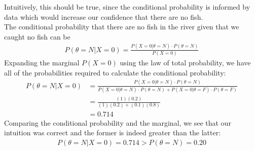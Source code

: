 Intuitively, this should be true, since the conditional probability is informed by data which would increase our confidence that there are no fish.\\
The conditional probability that there are no fish in the river given that we caught no fish can be \begin{align*}
    P(\theta=N|X=0) = \frac{P(X=0|\theta=N)\cdot P(\theta=N)}{P(X=0)}
\end{align*}
Expanding the marginal $P(X=0)$ using the law of total probability, we have all of the probabilities required to calculate the conditional probability:
\begin{align*}
    P(\theta=N|X=0) &= \frac{P(X=0|\theta=N)\cdot P(\theta=N)}{P(X=0|\theta=N)\cdot P(\theta=N)+P(X=0|\theta=F)\cdot P(\theta=F)}\\
    &= \frac{(1)(0.2)}{(1)(0.2)+(0.1)(0.8)}\\
    &= 0.714
\end{align*}
Comparing the conditional probability and the marginal, we see that our intuition was correct and the former is indeed greater than the latter:
\begin{align*}
    P(\theta=N|X=0) = 0.714 > P(\theta=N) = 0.20
\end{align*}